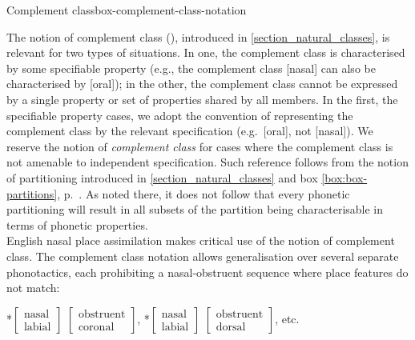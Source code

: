 \largerpage
 \begin{dadpbox}{Complement class}{box-complement-class-notation}


The notion of complement class (\citealt{Hayes+:2008}), introduced in \Sec\ref{section_natural_classes}, is relevant for two types of situations. In one, the complement class is characterised by some specifiable property (e.g., the complement class [\up{$\wedge$}nasal] can also be characterised by [oral]); in the other,  the complement class cannot be expressed by a single property or set of properties shared by all members.  In the first, the specifiable property cases,  we adopt the convention of representing the complement class by the relevant specification (e.g.\ [oral], not [\up{$\wedge$}nasal]). We reserve the notion of {\it complement class} for cases where  the complement class is not amenable to independent specification. Such reference follows from the notion of partitioning introduced in \textsection\ref{section_natural_classes} and box \ref{box:box-partitions}, p.\ \pageref{box:box-partitions}. As noted there, it does not follow that every phonetic partitioning will result in all subsets of the partition being characterisable in terms of phonetic properties.\\

English nasal place assimilation makes critical use of the notion of complement class. The complement class notation allows generalisation over several separate phonotactics, each prohibiting a nasal-obstruent sequence where place features do not match: 

\begin{center}
*$\begin{bmatrix}\textrm{nasal}\\\textrm{labial}\end{bmatrix}$  $\begin{bmatrix}\textrm{obstruent}\\\textrm{coronal}\end{bmatrix}$, *$\begin{bmatrix}\textrm{nasal}\\\textrm{labial}\end{bmatrix}$ $\begin{bmatrix}\textrm{obstruent}\\ \textrm{dorsal}\end{bmatrix}$, etc. 
\end{center}


\end{dadpbox}
